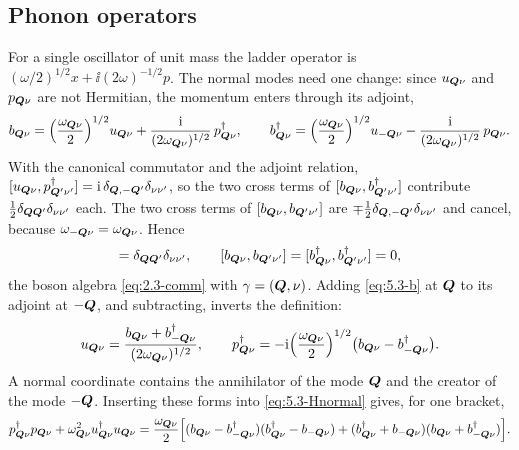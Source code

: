 \subsection{Phonon operators}

For a single oscillator of unit mass the ladder operator is $(\omega/2)^{1/2}x + \ii(2\omega)^{-1/2}p$. The normal modes need one change: since $u_{\bm{Q}\nu}$ and $p_{\bm{Q}\nu}$ are not Hermitian, the momentum enters through its adjoint,
\begin{equation}
  b_{\bm{Q}\nu} = \Bigl(\frac{\omega_{\bm{Q}\nu}}{2}\Bigr)^{1/2}u_{\bm{Q}\nu} + \frac{\mathrm{i}}{(2\omega_{\bm{Q}\nu})^{1/2}}\,p^\dagger_{\bm{Q}\nu} , \qquad
  b^\dagger_{\bm{Q}\nu} = \Bigl(\frac{\omega_{\bm{Q}\nu}}{2}\Bigr)^{1/2}u_{-\bm{Q}\nu} - \frac{\mathrm{i}}{(2\omega_{\bm{Q}\nu})^{1/2}}\,p_{\bm{Q}\nu} .
  \label{eq:5.3-b}
\end{equation}
With the canonical commutator and the adjoint relation, $[u_{\bm{Q}\nu}, p^\dagger_{\bm{Q}'\nu'}] = \mathrm{i}\,\delta_{\bm{Q},-\bm{Q}'}\delta_{\nu\nu'}$, so the two cross terms of $[b_{\bm{Q}\nu}, b^\dagger_{\bm{Q}'\nu'}]$ contribute $\tfrac12\delta_{\bm{Q}\bm{Q}'}\delta_{\nu\nu'}$ each. The two cross terms of $[b_{\bm{Q}\nu}, b_{\bm{Q}'\nu'}]$ are $\mp\tfrac12\delta_{\bm{Q},-\bm{Q}'}\delta_{\nu\nu'}$ and cancel, because $\omega_{-\bm{Q}\nu} = \omega_{\bm{Q}\nu}$. Hence
\begin{equation*}
  [b_{\vect{Q}\nu}, b^\dagger_{\vect{Q}'\nu'}] = \delta_{\vect{Q}\vect{Q}'}\delta_{\nu\nu'} , \qquad
  [b_{\vect{Q}\nu}, b_{\vect{Q}'\nu'}] = [b^\dagger_{\vect{Q}\nu}, b^\dagger_{\vect{Q}'\nu'}] = 0 ,
\end{equation*}
the boson algebra \cref{eq:2.3-comm} with $\gamma = (\bm{Q}, \nu)$. Adding \cref{eq:5.3-b} at $\bm{Q}$ to its adjoint at $-\bm{Q}$, and subtracting, inverts the definition:
\begin{equation*}
  u_{\bm{Q}\nu} = \frac{b_{\bm{Q}\nu} + b^\dagger_{-\bm{Q}\nu}}{(2\omega_{\bm{Q}\nu})^{1/2}} , \qquad
  p^\dagger_{\bm{Q}\nu} = -\mathrm{i}\Bigl(\frac{\omega_{\bm{Q}\nu}}{2}\Bigr)^{1/2}\bigl(b_{\bm{Q}\nu} - b^\dagger_{-\bm{Q}\nu}\bigr) .
\end{equation*}
A normal coordinate contains the annihilator of the mode $\bm{Q}$ and the creator of the mode $-\bm{Q}$. Inserting these forms into \cref{eq:5.3-Hnormal} gives, for one bracket,
\begin{equation*}
  p^\dagger_{\bm{Q}\nu}p_{\bm{Q}\nu} + \omega^2_{\bm{Q}\nu}u^\dagger_{\bm{Q}\nu}u_{\bm{Q}\nu}
  = \frac{\omega_{\bm{Q}\nu}}{2}\Bigl[(b_{\bm{Q}\nu} - b^\dagger_{-\bm{Q}\nu})(b^\dagger_{\bm{Q}\nu} - b_{-\bm{Q}\nu}) + (b^\dagger_{\bm{Q}\nu} + b_{-\bm{Q}\nu})(b_{\bm{Q}\nu} + b^\dagger_{-\bm{Q}\nu})\Bigr] .
\end{equation*}
